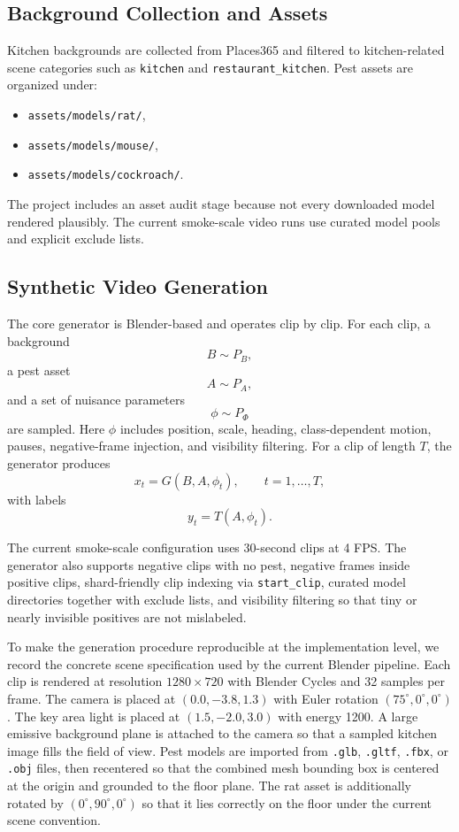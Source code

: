 \documentclass[11pt]{article}
\begin{document}
\subsection{Background Collection and Assets}
Kitchen backgrounds are collected from Places365 \cite{zhou2018places} and filtered to kitchen-related scene categories such as \texttt{kitchen} and \texttt{restaurant\_kitchen}. Pest assets are organized under:
\begin{itemize}[leftmargin=1.5em]
    \item \texttt{assets/models/rat/},
    \item \texttt{assets/models/mouse/},
    \item \texttt{assets/models/cockroach/}.
\end{itemize}

The project includes an asset audit stage because not every downloaded model rendered plausibly. The current smoke-scale video runs use curated model pools and explicit exclude lists.

\subsection{Synthetic Video Generation}
The core generator is Blender-based and operates clip by clip. For each clip, a background
\[
B \sim P_B,
\]
a pest asset
\[
A \sim P_A,
\]
and a set of nuisance parameters
\[
\phi \sim P_{\Phi}
\]
are sampled. Here $\phi$ includes position, scale, heading, class-dependent motion, pauses, negative-frame injection, and visibility filtering. For a clip of length $T$, the generator produces
\[
x_t = G(B, A, \phi_t), \qquad t=1,\dots,T,
\]
with labels
\[
y_t = T(A, \phi_t).
\]

The current smoke-scale configuration uses 30-second clips at 4 FPS. The generator also supports negative clips with no pest, negative frames inside positive clips, shard-friendly clip indexing via \texttt{start\_clip}, curated model directories together with exclude lists, and visibility filtering so that tiny or nearly invisible positives are not mislabeled.

To make the generation procedure reproducible at the implementation level, we record the concrete scene specification used by the current Blender pipeline. Each clip is rendered at resolution $1280 \times 720$ with Blender Cycles and 32 samples per frame. The camera is placed at $(0.0, -3.8, 1.3)$ with Euler rotation $(75^\circ, 0^\circ, 0^\circ)$. The key area light is placed at $(1.5, -2.0, 3.0)$ with energy 1200. A large emissive background plane is attached to the camera so that a sampled kitchen image fills the field of view. Pest models are imported from \texttt{.glb}, \texttt{.gltf}, \texttt{.fbx}, or \texttt{.obj} files, then recentered so that the combined mesh bounding box is centered at the origin and grounded to the floor plane. The rat asset is additionally rotated by $(0^\circ, 90^\circ, 0^\circ)$ so that it lies correctly on the floor under the current scene convention.
\end{document}
